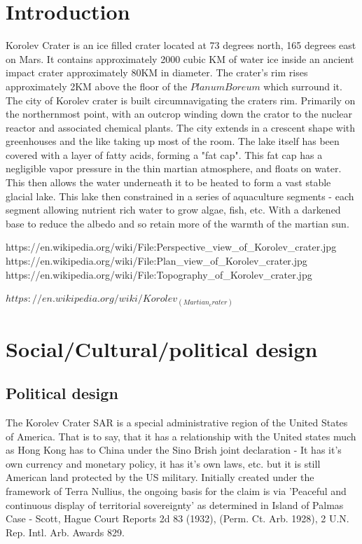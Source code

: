 \documentclass[10pt]{article}
\begin{document}
\section*{Introduction}
Korolev Crater is an ice filled crater located at 73 degrees north, 165 degrees east on Mars. It contains approximately 2000 cubic KM of water ice inside an ancient impact crater approximately 80KM in diameter. The crater's rim rises approximately 2KM above the floor of the $Planum Boreum$ which surround it. The city of Korolev crater is built circumnavigating the craters rim. Primarily on the northernmost point, with an outcrop winding down the crator to the nuclear reactor and associated chemical plants. The city extends in a crescent shape with greenhouses and the like taking up most of the room. The lake itself has been covered with a layer of fatty acids, forming a "fat cap". This fat cap has a negligible vapor pressure in the thin martian atmosphere, and floats on water. This then allows the water underneath it to be heated to form a vast stable glacial lake. This lake then constrained in a series of aquaculture segments - each segment allowing nutrient rich water to grow algae, fish, etc. With a darkened base to reduce the albedo and so retain more of the warmth of the martian sun.

https://en.wikipedia.org/wiki/File:Perspective_view_of_Korolev_crater.jpg
https://en.wikipedia.org/wiki/File:Plan_view_of_Korolev_crater.jpg
https://en.wikipedia.org/wiki/File:Topography_of_Korolev_crater.jpg

$https://en.wikipedia.org/wiki/Korolev_(Martian_crater)$
\section*{Social/Cultural/political design}

\subsection*{Political design}
The Korolev Crater SAR is a special administrative region of the United States of America. That is to say, that it has a relationship with the United states much as Hong Kong has to China under the Sino Brish joint declaration - It has it's own currency and monetary policy, it has it's own laws, etc. but it is still American land protected by the US military. Initially created under the framework of Terra Nullius, the ongoing basis for the claim is via 'Peaceful and continuous display of territorial sovereignty' as determined in Island of Palmas Case - Scott, Hague Court Reports 2d 83 (1932), (Perm. Ct. Arb. 1928), 2 U.N. Rep. Intl. Arb. Awards 829. 
\end{document}
